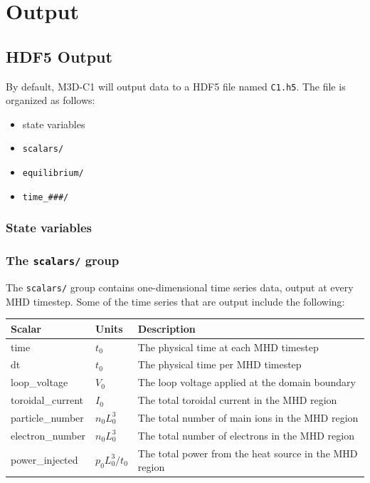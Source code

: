 \section{Output}

\subsection{HDF5 Output}

By default, M3D-C1 will output data to a HDF5 file named \texttt{C1.h5}.  The file is organized as follows:

\begin{itemize}
\item state variables
\item \texttt{scalars/}
\item \texttt{equilibrium/}
\item \texttt{time\_\#\#\#/}
\end{itemize}  

\subsubsection{State variables}

\subsubsection{The \texttt{scalars/} group}

The \texttt{scalars/} group contains one-dimensional time series data,
output at every MHD timestep.  Some of the time series that are output
include the following:

\begin{tabular}{lll}
\textbf{Scalar}   & \textbf{Units} & \textbf{Description} \\
\hline
time              & $t_0$          & The physical time at each MHD timestep\\
dt                & $t_0$          & The physical time per MHD timestep\\ 
loop\_voltage     & $V_0$          & The loop voltage applied at the domain boundary\\
toroidal\_current & $I_0$          & The total toroidal current in the MHD region\\
particle\_number  & $n_0 L_0^3$    & The total number of main ions in the MHD region\\
electron\_number  & $n_0 L_0^3$    & The total number of electrons in the MHD region\\
power\_injected   & $p_0 L_0^3 / t_0$ & The total power from the heat source in the MHD region
\end{tabular}

